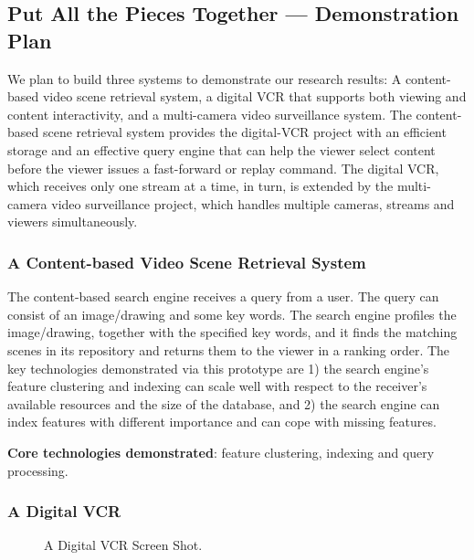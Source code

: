\subsection{Put All the Pieces Together --- Demonstration Plan}

We plan to build three systems to demonstrate our research
results: A content-based video scene retrieval system, a digital VCR
that supports both viewing and content interactivity, and
a multi-camera video surveillance system. 
The content-based scene retrieval system
provides the digital-VCR project with an
efficient storage and an effective query engine that can help
the viewer select content
before the viewer issues a fast-forward or replay command.
The digital VCR, which receives only
one stream at a time, in turn, is extended
by the multi-camera video surveillance project, which 
handles multiple cameras, streams and viewers simultaneously.

\subsubsection{A Content-based Video Scene Retrieval System}

The content-based search engine receives a query 
from a user. The query can consist of an image/drawing and 
some key words. The search engine profiles
the image/drawing, together with the specified
key words, and it finds the matching scenes in its repository
and returns them to the viewer in a ranking order.   
The key technologies demonstrated via this prototype are
1) the search engine's feature clustering and
indexing can scale well with respect to
the receiver's available resources and the size of
the database, and 2) the search engine can index 
features with different importance and can
cope with missing features.

{\bf Core technologies demonstrated}: 
feature clustering, indexing and query processing.

\subsubsection{A Digital VCR}

\begin{figure}[t]
\centerline{}
\caption{A Digital VCR Screen Shot.}
\label{fig-codec}
\end{figure}

